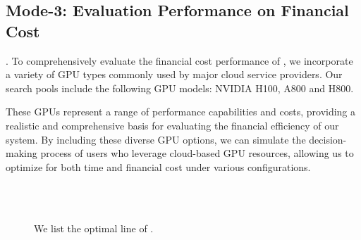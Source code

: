 \subsection{Mode-3: Evaluation Performance on Financial Cost}\label{sec:exp:finance}


. To comprehensively evaluate the financial cost performance of \sysname, we incorporate a variety of GPU types commonly used by major cloud service providers. Our search pools include the following GPU models: NVIDIA H100, A800 and H800.

These GPUs represent a range of performance capabilities and costs, providing a realistic and comprehensive basis for evaluating the financial efficiency of our system. By including these diverse GPU options, we can simulate the decision-making process of users who leverage cloud-based GPU resources, allowing us to optimize for both time and financial cost under various configurations.

\begin{figure}[t]
  \centering
    \\
    \\
  \caption{
  We list the optimal line of \sysname.
  }
  \label{fig:money}
\end{figure}